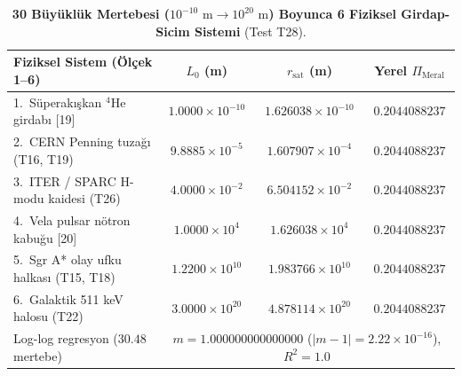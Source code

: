 \documentclass[12pt,a4paper]{article}
\begin{document}
\begin{table}[!htbp]
\centering
\footnotesize
\setlength{\tabcolsep}{2pt}
\caption{\textbf{30 Büyüklük Mertebesi ($10^{-10}\text{ m}\to 10^{20}\text{ m}$) Boyunca 6 Fiziksel Girdap-Sicim Sistemi} (Test T28).}
\label{tab:t28_scales}
\vspace{0.1cm}
\begin{tabular}{@{}l|c|c|c@{}}
\hline
\textbf{Fiziksel Sistem (Ölçek 1--6)} & \textbf{$L_0$ (m)} & \textbf{$r_{\mathrm{sat}}$ (m)} & \textbf{Yerel $\Pi_{\mathrm{Meral}}$} \\
\hline
1.\ Süperakışkan $^4\mathrm{He}$ girdabı [19] & $1.0000\times 10^{-10}$ & $1.626038\times 10^{-10}$ & $0.2044088237$ \\
2.\ CERN Penning tuzağı (T16, T19) & $9.8885\times 10^{-5}$ & $1.607907\times 10^{-4}$ & $0.2044088237$ \\
3.\ ITER / SPARC H-modu kaidesi (T26) & $4.0000\times 10^{-2}$ & $6.504152\times 10^{-2}$ & $0.2044088237$ \\
4.\ Vela pulsar nötron kabuğu [20] & $1.0000\times 10^{4}$ & $1.626038\times 10^{4}$ & $0.2044088237$ \\
5.\ Sgr A* olay ufku halkası (T15, T18) & $1.2200\times 10^{10}$ & $1.983766\times 10^{10}$ & $0.2044088237$ \\
6.\ Galaktik 511 keV halosu (T22) & $3.0000\times 10^{20}$ & $4.878114\times 10^{20}$ & $0.2044088237$ \\
\hline
Log-log regresyon ($30.48$ mertebe) & \multicolumn{3}{c}{$m = 1.000000000000000$ ($|m-1|=2.22\times 10^{-16}$), $R^2 = 1.0$} \\
\hline
\end{tabular}
\end{table}
\end{document}
